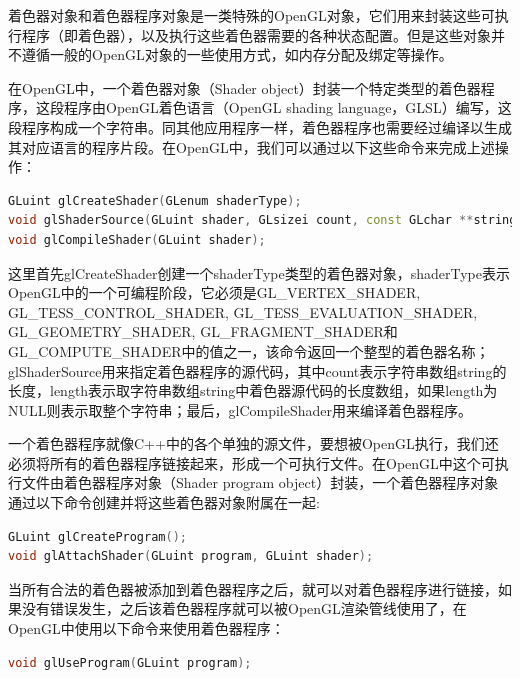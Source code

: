 着色器对象和着色器程序对象是一类特殊的OpenGL对象，它们用来封装这些可执行程序（即着色器），以及执行这些着色器需要的各种状态配置。但是这些对象并不遵循一般的OpenGL对象的一些使用方式，如内存分配及绑定等操作。

在OpenGL中，一个着色器对象（Shader object）封装一个特定类型的着色器程序，这段程序由OpenGL着色语言（OpenGL shading language，GLSL）\cite{b:TheOpenGLShadingLanguage}编写，这段程序构成一个字符串。同其他应用程序一样，着色器程序也需要经过编译以生成其对应语言的程序片段。在OpenGL中，我们可以通过以下这些命令来完成上述操作：

\begin{lstlisting}[language=C++]
GLuint glCreateShader​(GLenum shaderType​);
void glShaderSource​(GLuint shader​, GLsizei count​, const GLchar **string​, const GLint *length​);
void glCompileShader​(GLuint shader​);	
\end{lstlisting}

这里首先glCreateShader创建一个shaderType类型的着色器对象，shaderType表示OpenGL中的一个可编程阶段，它必须是GL\_VERTEX\_SHADER, GL\_TESS\_CONTROL\_SHADER, GL\_TESS\_EVALUATION\_SHADER, GL\_GEOMETRY\_SHADER, GL\_FRAGMENT\_SHADER和GL\_COMPUTE\_SHADER中的值之一，该命令返回一个整型的着色器名称；glShaderSource用来指定着色器程序的源代码，其中count表示字符串数组string的长度，length表示取字符串数组string中着色器源代码的长度数组，如果length为NULL则表示取整个字符串；最后，glCompileShader用来编译着色器程序。

一个着色器程序就像C++中的各个单独的源文件，要想被OpenGL执行，我们还必须将所有的着色器程序链接起来，形成一个可执行文件。在OpenGL中这个可执行文件由着色器程序对象（Shader program object）封装，一个着色器程序对象通过以下命令创建并将这些着色器对象附属在一起:

\begin{lstlisting}[language=C++]
GLuint glCreateProgram​();
void glAttachShader​(GLuint program​, GLuint shader​);
\end{lstlisting}

当所有合法的着色器被添加到着色器程序之后，就可以对着色器程序进行链接，如果没有错误发生，之后该着色器程序就可以被OpenGL渲染管线使用了，在OpenGL中使用以下命令来使用着色器程序：

\begin{lstlisting}[language=C++]
void glUseProgram(GLuint program​);
\end{lstlisting}

